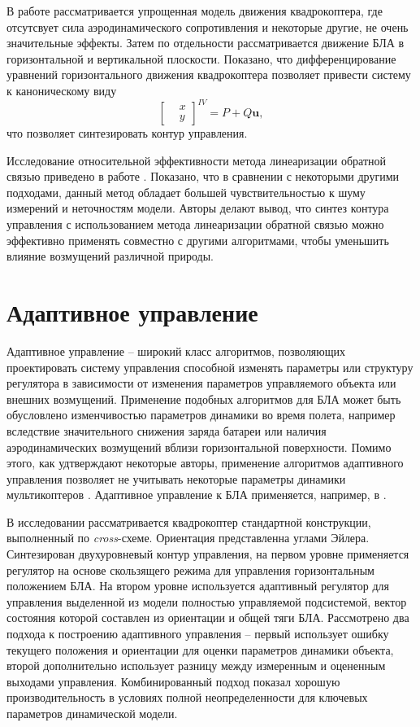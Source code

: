 В работе \cite{Kanatnikov} рассматривается упрощенная модель движения квадрокоптера, где отсутсвует сила аэродинамического сопротивления и некоторые другие, не очень значительные эффекты.
Затем по отдельности рассматривается движение БЛА в горизонтальной и вертикальной плоскости.
Показано, что дифференцирование уравнений горизонтального движения квадрокоптера позволяет привести систему к каноническому виду 
\begin{equation*}
\begin{bmatrix}
&x\\ &y
\end{bmatrix} ^{IV}
=
P + Q \bm{u},
\end{equation*}
что позволяет синтезировать контур управления.

Исследование относительной эффективности метода линеаризации обратной связью приведено в работе \cite{Lee01}. Показано, что в сравнении с некоторыми другими подходами, данный метод обладает большей чувствительностью к шуму измерений и неточностям модели. Авторы делают вывод, что синтез контура управления с использованием метода линеаризации обратной связью можно эффективно применять совместно с другими алгоритмами, чтобы уменьшить влияние возмущений различной природы.

\section{Адаптивное управление}

Адаптивное управление -- широкий класс алгоритмов, позволяющих проектировать систему управления способной изменять параметры или структуру регулятора в зависимости от изменения параметров управляемого объекта или внешних возмущений.
Применение подобных алгоритмов для БЛА может быть обусловлено изменчивостью параметров динамики во время полета, например вследствие значительного снижения заряда батареи или наличия аэродинамических возмущений вблизи горизонтальной поверхности. Помимо этого, как удтверждают некоторые авторы, применение алгоритмов адаптивного управления позволяет не учитывать некоторые параметры динамики мультикоптеров \cite{Belyavskiy01}. Адаптивное управление к БЛА применяется, например, в \cite{Dydek01, Mu01, Bara01}.

В исследовании \cite{Bara01} рассматривается квадрокоптер стандартной конструкции, выполненный по \textit{cross}-схеме. Ориентация представленна углами Эйлера. Синтезирован двухуровневый контур управления, на первом уровне применяется регулятор на основе скользящего режима для управления горизонтальным положением БЛА. На втором уровне используется адаптивный регулятор для управления выделенной из модели полностью управляемой подсистемой, вектор состояния которой составлен из ориентации и общей тяги БЛА. Рассмотрено два подхода к построению адаптивного управления -- первый использует ошибку текущего положения и ориентации для оценки параметров динамики объекта, второй дополнительно использует разницу между измеренным и оцененным выходами управления. Комбинированный подход показал хорошую производительность в условиях полной неопределенности для ключевых параметров динамической модели.

